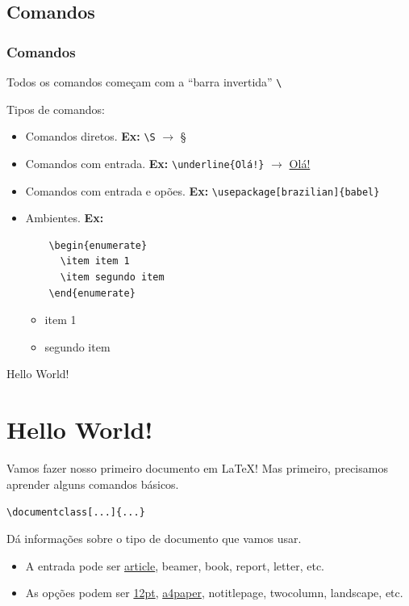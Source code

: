 \documentclass[12pt]{beamer}
\begin{document}
\begin{frame}[fragile]
  \section{Comandos}
    \frametitle{Comandos}
     Todos os comandos começam com a ``barra invertida'' \verb+\+
\medskip

     Tipos de comandos:
     \begin{itemize}
       \item Comandos diretos. \textbf{Ex:} \verb+\S+ $\rightarrow$ \S

       \item Comandos com entrada. \textbf{Ex:} \verb+\underline{Olá!}+ $\rightarrow$ \underline{Olá!}

     \end{itemize}
\end{frame}

\begin{frame}[fragile]
  \begin{itemize}
    \item Comandos com entrada e opões. \textbf{Ex:} \verb+\usepackage[brazilian]{babel}+

    \item Ambientes. \textbf{Ex:}
    \begin{verbatim}
    \begin{enumerate}
      \item item 1
      \item segundo item
    \end{enumerate}
  \end{verbatim}
  \begin{itemize}
    \item item 1
    \item segundo item
  \end{itemize}
  \end{itemize}
\end{frame}

\begin{frame}{Hello World!}
  \section{Hello World!}
  \large Vamos fazer nosso primeiro documento em \LaTeX!
  Mas primeiro, precisamos aprender alguns comandos básicos.
\end{frame}

\begin{frame}[fragile]
  \begin{center}\large
    \verb+\documentclass[...]{...}+
  \end{center}
  Dá informações sobre o tipo de documento que vamos usar.
  \begin{itemize}
    \item A entrada pode ser \underline{article}, beamer, book, report, letter, etc.
    \item As opções podem ser \underline{12pt}, \underline{a4paper}, notitlepage, twocolumn, landscape, etc.
  \end{itemize}
\end{frame}
\end{document}

